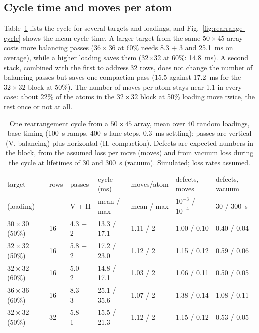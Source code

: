 \subsection{Cycle time and moves per atom}\label{sec:rearrange-cycle}

Table~\ref{tab:rearrange-cycle} lists the cycle for several targets and loadings, and Fig.~\ref{fig:rearrange-cycle} shows the mean cycle time. A larger target from the same $50\times45$ array costs more balancing passes ($36\times36$ at 60\% needs 8.3 + 3 and 25.1~ms on average), while a higher loading saves them (32$\times$32 at 60\%: 14.8~ms). A second stack, combined with the first to address 32 rows, does not change the number of balancing passes but saves one compaction pass (15.5 against 17.2~ms for the $32\times32$ block at 50\%). The number of moves per atom stays near 1.1 in every case: about 22\% of the atoms in the $32\times32$ block at 50\% loading move twice, the rest once or not at all.

\begin{table}[htbp]\centering\small
\caption{One rearrangement cycle from a $50\times45$ array, mean over 40 random loadings, base timing (100~\textmu s ramps, 400~\textmu s lane steps, 0.3~ms settling); passes are vertical (V, balancing) plus horizontal (H, compaction). Defects are expected numbers in the block, from the assumed loss per move (moves) and from vacuum loss during the cycle at lifetimes of 30 and 300~s (vacuum). Simulated; loss rates assumed.}
\label{tab:rearrange-cycle}
\setlength{\tabcolsep}{3.5pt}
\begin{tabular}{lllllll}
\toprule
target & rows & passes & cycle (ms) & moves/atom & defects, moves & defects, vacuum \\
(loading) & & V + H & mean / max & mean / max & $10^{-3}$ / $10^{-4}$ & 30 / 300~s \\
\midrule
$30\times30$ (50\%) & 16 & 4.3 + 2 & 13.3 / 17.1 & 1.11 / 2 & 1.00 / 0.10 & 0.40 / 0.04 \\
$32\times32$ (50\%) & 16 & 5.8 + 2 & 17.2 / 23.0 & 1.12 / 2 & 1.15 / 0.12 & 0.59 / 0.06 \\
$32\times32$ (60\%) & 16 & 5.0 + 2 & 14.8 / 17.1 & 1.03 / 2 & 1.06 / 0.11 & 0.50 / 0.05 \\
$36\times36$ (60\%) & 16 & 8.3 + 3 & 25.1 / 35.6 & 1.07 / 2 & 1.38 / 0.14 & 1.08 / 0.11 \\
$32\times32$ (50\%) & 32 & 5.8 + 1 & 15.5 / 21.3 & 1.12 / 2 & 1.15 / 0.12 & 0.53 / 0.05 \\
\bottomrule
\end{tabular}
\end{table}

